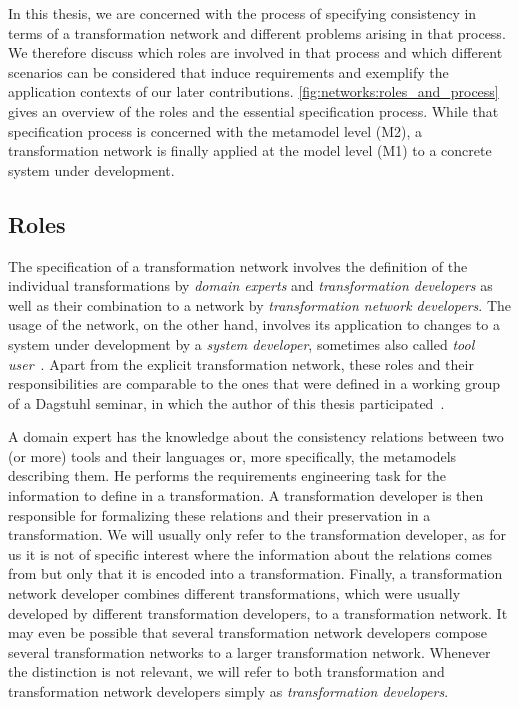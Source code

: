 In this thesis, we are concerned with the process of specifying consistency in terms of a transformation network and different problems arising in that process.
We therefore discuss which roles are involved in that process and which different scenarios can be considered that induce requirements and exemplify the application contexts of our later contributions.
\autoref{fig:networks:roles_and_process} gives an overview of the roles and the essential specification process.
While that specification process is concerned with the metamodel level (M2), a transformation network is finally applied at the model level (M1) to a concrete system under development.

\subsection{Roles}

The specification of a transformation network involves the definition of the individual transformations by \emph{domain experts} and \emph{transformation developers} as well as their combination to a network by \emph{transformation network developers}.
The usage of the network, on the other hand, involves its application to changes to a system under development by a \emph{system developer}, sometimes also called \emph{tool user}~\cite{klare2019dagstuhl}.
Apart from the explicit transformation network, these roles and their responsibilities are comparable to the ones that were defined in a working group of a Dagstuhl seminar, in which the author of this thesis participated~\cite{klare2019dagstuhl}.

A domain expert has the knowledge about the consistency relations between two (or more) tools and their languages or, more specifically, the metamodels describing them.
He performs the requirements engineering task for the information to define in a transformation.
A transformation developer is then responsible for formalizing these relations and their preservation in a transformation.
We will usually only refer to the transformation developer, as for us it is not of specific interest where the information about the relations comes from but only that it is encoded into a transformation.
Finally, a transformation network developer combines different transformations, which were usually developed by different transformation developers, to a transformation network.
It may even be possible that several transformation network developers compose several transformation networks to a larger transformation network. 
Whenever the distinction is not relevant, we will refer to both transformation and transformation network developers simply as \emph{transformation developers}.

